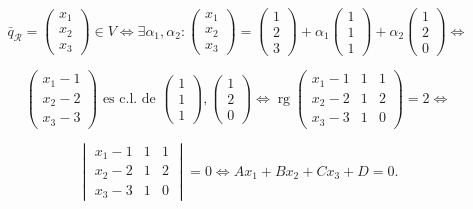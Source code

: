 \documentclass[11pt]{article}
\DeclareMathOperator{\rg}{rg}
\begin{document}
$$
\bar{q}_{\mathcal{R}}=\begin{pmatrix}x_1\\ x_2\\ x_3\end{pmatrix}\in V\iff\exists\alpha_1,\alpha_2:\begin{pmatrix}x_1\\ x_2\\ x_3\end{pmatrix}=\begin{pmatrix}1\\ 2\\ 3\end{pmatrix}+\alpha_1\begin{pmatrix}1\\ 1\\ 1\end{pmatrix}+\alpha_2\begin{pmatrix}1\\ 2\\ 0\end{pmatrix}\iff
$$

$$
\begin{pmatrix}x_1-1\\ x_2-2\\ x_3-3\end{pmatrix}\textrm{ es c.l. de }\begin{pmatrix}1\\ 1\\ 1\end{pmatrix},\begin{pmatrix}1\\ 2\\ 0\end{pmatrix}\iff\rg\begin{pmatrix}
x_1-1 & 1 & 1\\
x_2-2 & 1 & 2\\
x_3-3 & 1 & 0
\end{pmatrix}=2\iff
$$

$$
\begin{vmatrix}
x_1-1 & 1 & 1\\
x_2-2 & 1 & 2\\
x_3-3 & 1 & 0
\end{vmatrix}=0\iff Ax_1+Bx_2+Cx_3+D=0.
$$
\end{document}

